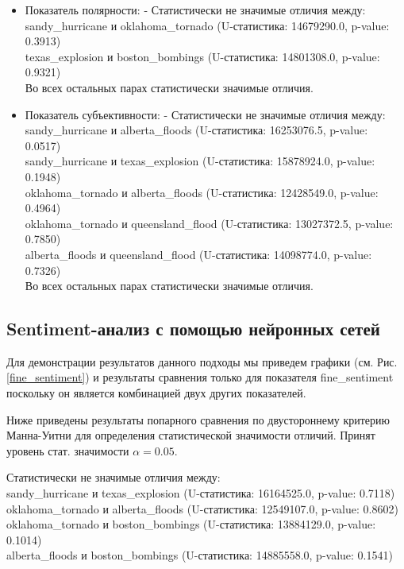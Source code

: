 \documentclass[11pt]{article}
\begin{document}
\begin{itemize}
    \item Показатель полярности: - Статистически не значимые отличия между:\\
    sandy\_hurricane и oklahoma\_tornado (U-статистика: 14679290.0, p-value: 0.3913) \\
    texas\_explosion и boston\_bombings (U-статистика: 14801308.0, p-value: 0.9321) \\
    Во всех остальных парах статистически значимые отличия.
    
    \item Показатель субъективности: - Статистически не значимые отличия между:\\
    sandy\_hurricane и alberta\_floods (U-статистика: 16253076.5, p-value: 0.0517) \\
    sandy\_hurricane и texas\_explosion (U-статистика: 15878924.0, p-value: 0.1948) \\
    oklahoma\_tornado и alberta\_floods (U-статистика: 12428549.0, p-value: 0.4964) \\
    oklahoma\_tornado и queensland\_flood (U-статистика: 13027372.5, p-value: 0.7850) \\
    alberta\_floods и queensland\_flood (U-статистика: 14098774.0, p-value: 0.7326) \\
    Во всех остальных парах статистически значимые отличия.
\end{itemize}

\subsection{Sentiment-анализ с помощью нейронных сетей}

Для демонстрации результатов данного подходы мы приведем графики (см. Рис. \ref{fine_sentiment}) и результаты сравнения только для показателя fine\_sentiment поскольку он является комбинацией двух других показателей.

Ниже приведены результаты попарного сравнения по двустороннему критерию Манна-Уитни для определения статистической значимости отличий. Принят уровень стат. значимости $\alpha = 0.05$.

Статистически не значимые отличия между:\\
    sandy\_hurricane и texas\_explosion (U-статистика: 16164525.0, p-value: 0.7118) \\
    oklahoma\_tornado и alberta\_floods (U-статистика: 12549107.0, p-value: 0.8602) \\
    oklahoma\_tornado и boston\_bombings (U-статистика: 13884129.0, p-value: 0.1014) \\
    alberta\_floods и boston\_bombings (U-статистика: 14885558.0, p-value: 0.1541) \\
    
\end{document}
